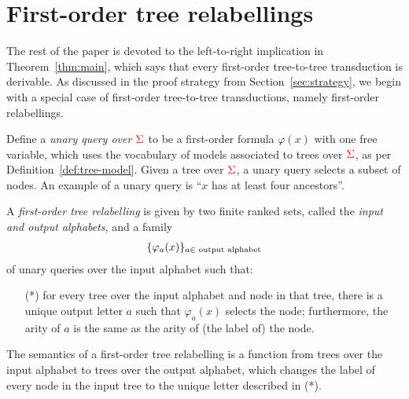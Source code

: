 \section{First-order tree relabellings}\label{sec:fo-translation}
The rest of the paper is devoted to the left-to-right implication in Theorem~\ref{thm:main}, which says that every first-order tree-to-tree transduction is derivable. As discussed in the proof strategy from Section~\ref{sec:strategy}, we begin with a special case of first-order tree-to-tree transductions, namely first-order relabellings. 

Define a \emph{unary   query over ${\color{red}{\Sigma}}$} to be a first-order formula $\varphi(x)$ with one free variable, which uses the  vocabulary of models associated to  trees over ${\color{red}{\Sigma}}$, as per Definition~\ref{def:tree-model}. Given a tree over ${\color{red}{\Sigma}}$, a unary  query selects a subset of nodes. An example of a unary query is ``$x$ has at least four ancestors''. 

\begin{definition} \label{def:forat}  A \emph{first-order tree relabelling} is given by two finite ranked sets, called the \emph{input and output alphabets}, and a family 
    \begin{align*}
    \{\varphi_a(x)\}_{a \in \text{ output alphabet}}
    \end{align*}
    of unary queries over the input alphabet such that:
    \begin{enumerate}
        \item[(*)] for every tree over the input alphabet and node in that tree, there is a unique output letter $a$ such that $\varphi_a(x)$ selects the node; furthermore, the arity of $a$ is the same as the arity of (the label of) the node. 
    \end{enumerate}
The semantics of a  first-order tree relabelling is a function from trees over the input alphabet to trees over the output alphabet, which changes the label of every node in the input tree to the unique letter described in  (*). 
      \end{definition}


